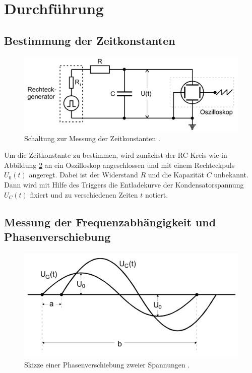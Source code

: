 \section{Durchführung}
\label{sec:Durchführung}

\subsection{Bestimmung der Zeitkonstanten}
\begin{figure}
    \centering
    \includegraphics[width=\textwidth]{pictures/zeitkonstante.png}
    \caption{Schaltung zur Messung der Zeitkonstanten \cite{v353}.}
    \label{fig:zeitkonstante}
\end{figure}

Um die Zeitkonstante zu bestimmen, wird zunächst der RC-Kreis wie in Abbildung \ref{fig:zeitkonstante}
an ein Oszilloskop angeschlossen und mit einem Rechteckpuls $U_0 (t)$ angeregt.
Dabei ist der Widerstand $R$ und die Kapazität $C$ unbekannt.
Dann wird mit Hilfe des Triggers die Entladekurve der Kondensatorspannung $U_C (t)$ fixiert und
zu verschiedenen Zeiten $t$ notiert.

\subsection{Messung der Frequenzabhängigkeit und Phasenverschiebung}

\begin{figure}
    \centering
    \includegraphics[width=\textwidth]{pictures/Phasenverschiebung.png}
    \caption{Skizze einer Phasenverschiebung zweier Spannungen \cite{v353}.}
    \label{fig:zeitkonstante}
\end{figure}

